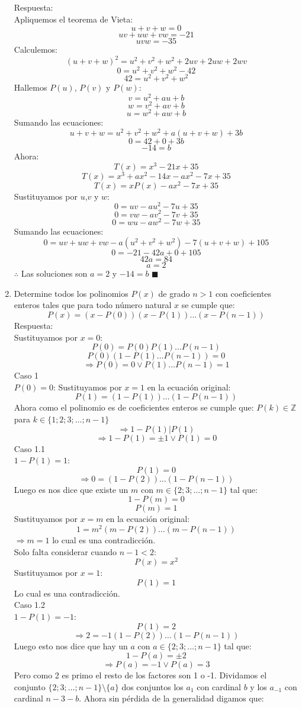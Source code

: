 \documentclass{book}
\newcommand{\Z}{\mathbb{Z}} \def\max{\mathop{\mbox{\rm máx}}} %
\begin{document}
\begin{enumerate}
				Respuesta:\\
				Apliquemos el teorema de Vieta:
$$u+v+w=0$$
$$uv+uw+vw=-21$$
$$uvw=-35$$
Calculemos:
$$(u+v+w)^2=u^2+v^2+w^2+2uv+2uw+2wv$$
$$0=u^2+v^2+w^2-42$$
$$42=u^2+v^2+w^2$$
Hallemos $P(u)$, $P(v)$ y $P(w)$:
$$v=u^2+au+b$$
$$w=v^2+av+b$$
$$u=w^2+aw+b$$
Sumando las ecuaciones:
$$u+v+w=u^2+v^2+w^2+a(u+v+w)+3b$$
$$0=42+0+3b$$
$$-14=b$$
Ahora:
$$T(x) = x^3  -21x + 35$$
$$T(x)= x^3+ax^2-14x-ax^2-7x+35$$
$$T(x)= xP(x)-ax^2-7x+35$$
Sustituyamos por $u$,$v$ y $w$:
$$0=uv-au^2-7u+35$$
$$0=vw-av^2-7v+35$$
$$0=wu-aw^2-7w+35$$
Sumando las ecuaciones:
$$0=uv+uw+vw-a(u^2+v^2+w^2 )-7(u+v+w)+105$$
$$0=-21-42a+0+105$$
$$42a=84$$
$$a=2$$
$\therefore$ Las soluciones son $a=2$ y $-14=b$ $\blacksquare$\\
				\item Determine todos los polinomios $P(x)$ de grado $n>1$ con coeficientes enteros tales que para todo número natural $x$ se cumple que:
		$$P(x)=(x-P(0))(x-P(1))\ldots(x-P(n-1))$$
		Respuesta:\\
		Sustituyamos por $x=0$:
		$$P(0)=P(0)P(1)\ldots P(n-1)$$
		$$P(0)(1-P(1)\ldots P(n-1))=0$$
		$$\Rightarrow P(0)=0\vee P(1)\ldots P(n-1)=1$$
		Caso 1 \\$P(0)=0$:
		Sustituyamos por $x=1$ en la ecuación original:
		$$P(1)=(1-P(1))\ldots(1-P(n-1))$$
		Ahora como el polinomio es de coeficientes enteros se cumple que: $P(k)\in\Z$ para $k\in \{1;2;3;\ldots;n-1\}$
		$$\Rightarrow 1-P(1)|P(1)$$
		$$\Rightarrow 1-P(1)=\pm 1\vee P(1)=0$$
		Caso 1.1 \\$1-P(1)=1$:
		$$P(1)=0$$
		$$\Rightarrow 0=(1-P(2))\ldots(1-P(n-1))$$
		Luego es nos dice que existe un $m$ con $m\in\{2;3;\ldots;n-1\}$ tal que:
		$$1-P(m)=0$$
		$$P(m)=1$$
		Sustituyamos por $x=m$ en la ecuación original:
		$$1=m^2(m-P(2))\ldots(m-P(n-1))$$
		$\Rightarrow m=1$ lo cual es una contradicción.\\
		Solo falta considerar cuando $n-1<2$:
		$$P(x)=x^2$$
		Sustituyamos por $x=1$:
		$$P(1)=1$$
		Lo cual es una contradicción.\\
		Caso 1.2 \\$1-P(1)=-1$:
		$$P(1)=2$$
		$$\Rightarrow 2=-1(1-P(2))\ldots(1-P(n-1))$$
		Luego esto nos dice que hay un $a$ con $a\in\{2;3;\ldots;n-1\}$ tal que:
		$$1-P(a)=\pm 2$$
		$$\Rightarrow P(a)=-1\vee P(a)=3$$
		Pero como 2 es primo el resto de los factores son 1 o -1. Dividamos el conjunto $\{2;3;\ldots;n-1\}\setminus \{a\}$ dos conjuntos los $a_1$ con cardinal $b$ y los $a_{-1}$ con cardinal $n-3-b$. Ahora sin pérdida de la generalidad digamos que:

\end{enumerate}
\end{document}
